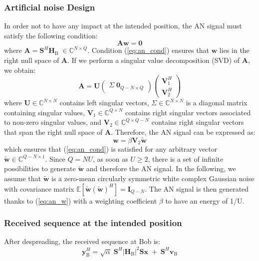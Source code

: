 \documentclass[journal,comsoc]{IEEEtran}
\newcommand{\module}[1]{\left|#1\right|}
\newcommand{\EX}[1]{\mathbb{E} \left[#1\right]}%
\newcommand{\HB}{\textbf{H}_{\text{B}}}
\newcommand{\spread}{\textbf{S}}
\newcommand{\w}{\textbf{w}}
\newcommand{\C}{\mathbb{C}}
\begin{document}
\subsubsection{Artificial noise Design}\label{sec:artificial-noise-design}
In order not to have any impact at the intended position, the AN signal must satisfy the following condition:
\begin{equation}
\textbf{A} \w \; = \; \textbf{0}
\label{eq:an_cond}
\end{equation}
where $\textbf{A} = \spread^H\HB\; \in \C^{N\times Q}$. Condition (\ref{eq:an_cond}) ensures that $\w$ lies in the right null space of $\textbf{A}$. If we perform a singular value decomposition (SVD) of $\textbf{A}$, we obtain:
\begin{equation}
\textbf{A} = \textbf{U} 
\begin{pmatrix}
\Sigma \; \textbf{0}_{Q-N\times Q}
\end{pmatrix}
\begin{pmatrix}
\textbf{V}_1^H \\
\textbf{V}_2^H
\end{pmatrix}
\label{eq:an_svd}
\end{equation}
where $\textbf{U} \in \C^{N \times N}$ contains left singular vectors, $\Sigma \in \C^{N \times N}$ is a diagonal matrix containing singular values, $\textbf{V}_1 \in \C^{Q \times N}$ contains right singular vectors associated to non-zero singular values, and $\textbf{V}_2 \in \C^{Q \times Q-N}$ contains right singular vectors that span the right null space of $\textbf{A}$. Therefore, the AN signal can be expressed as:
\begin{equation}
\w = \beta \textbf{V}_2 \tilde{\w}
\label{eq:an_w}
\end{equation}
which ensures that (\ref{eq:an_cond}) is satisfied for any arbitrary vector $\tilde{\w} \in \C^{Q-N \times 1}$. Since $Q = NU$, as soon as $U\geq 2$, there is a set of infinite possibilities to generate $\tilde{\w}$ and therefore the AN signal. In the following, we assume that $\tilde{\w}$ is a zero-mean circularly symmetric white complex Gaussian noise with covariance matrix $\EX{\tilde{\w}(\tilde{\w})^H} = \textbf{I}_{Q-N }$. The AN signal is then generated thanks to (\ref{eq:an_w}) with a weighting coefficient $\beta$ to have an energy of 1/U.


\subsubsection{Received sequence at the intended position}
After despreading, the received sequence at Bob is: 
\begin{equation}
\textbf{y}_{\text{B}}^H = \sqrt{\alpha} \; \spread^H \module{\HB}^2 \spread \textbf{x} \;  +  \;  \spread^H \textbf{v}_\text{B} 
\label{eq:rx_bob_AN}
\end{equation}
\end{document}

